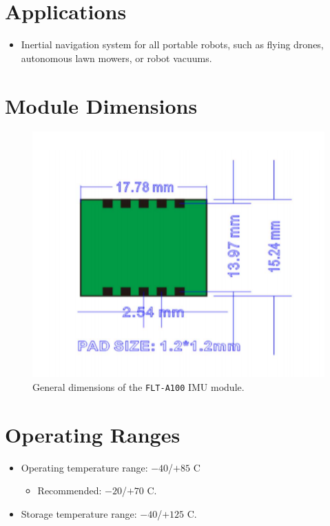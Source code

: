 \documentclass{scrreprt}
\newcommand{\modelno}{%
	\texttt{FLT-A100}
}
\begin{document}
\begin{CJK*}{UTF8}{gbsn}
\section{Applications}
\begin{itemize}
\item Inertial navigation system for all portable robots, such as flying drones,
autonomous lawn mowers, or robot vacuums.
\end{itemize}

\section{Module Dimensions}
\begin{figure}[H]
\includegraphics{module_dim.png}
\caption{General dimensions of the \modelno IMU module.}
\end{figure}

\section{Operating Ranges}
\begin{itemize}
\item Operating temperature range: $-40$/$+85$ \degree C
	\begin{itemize}
	\item Recommended: $-20$/$+70$ \degree C.
	\end{itemize}

\item Storage temperature range: $-40$/$+125$ \degree C.


\end{itemize}
\end{CJK*}
\end{document}
